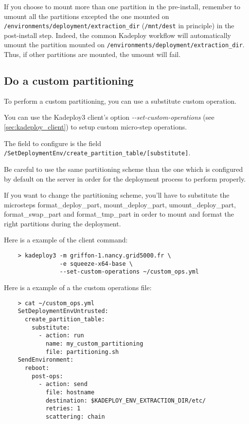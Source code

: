 \documentclass[a4wide,10pt,oneside]{book}
\newcommand{\ypath}[1]{\texttt{#1}}
\begin{document}
If you choose to mount more than one partition in the pre-install, remember to umount all the partitions excepted the one mounted on \ypath{/environments/deployment/extraction\_dir} (\texttt{/mnt/dest} in principle) in the post-install step. Indeed, the common Kadeploy workflow will automatically umount the partition mounted on \ypath{/environments/deployment/extraction\_dir}. Thus, if other partitions are mounted, the umount will fail.


\subsection{Do a custom partitioning}\label{sec:custom-partitioning}
To perform a custom partitioning, you can use a substitute custom operation.

You can use the Kadeploy3 client's option \emph{-{}-set-custom-operations} (see \ref{sec:kadeploy_client}) to setup custom micro-step operations.

The field to configure is the field \ypath{/SetDeploymentEnv/create\_partition\_table/[substitute]}.

Be careful to use the same partitioning scheme than the one which is configured by default on the server in order for the deployment process to perform properly.

If you want to change the partitioning scheme, you'll have to substitute the microsteps format\_deploy\_part, mount\_deploy\_part, umount\_deploy\_part, format\_swap\_part and format\_tmp\_part in order to mount and format the right partitions during the deployment.

Here is a example of the client command:
\begin{verbatim}
    > kadeploy3 -m griffon-1.nancy.grid5000.fr \
                -e squeeze-x64-base \
                --set-custom-operations ~/custom_ops.yml
\end{verbatim}

Here is a example of a the custom operations file:
\begin{small}
\begin{verbatim}
    > cat ~/custom_ops.yml
    SetDeploymentEnvUntrusted:
      create_partition_table:
        substitute:
          - action: run
            name: my_custom_partitioning
            file: partitioning.sh
    SendEnvironment:
      reboot:
        post-ops:
          - action: send
            file: hostname
            destination: $KADEPLOY_ENV_EXTRACTION_DIR/etc/
            retries: 1
            scattering: chain
\end{verbatim}
\end{small}
\end{document}
